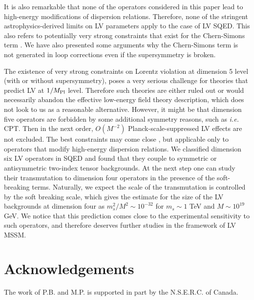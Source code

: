 \documentclass[12pt]{revtex4}
\begin{document}
It is also remarkable that none of the 
operators considered in this paper lead to high-energy modifications of dispersion relations. 
Therefore, none of the stringent astrophysics-derived limits on LV parameters 
\cite{Ted1,GK} apply to the case of LV SQED. This also refers to potentially very strong 
constraints that exist for the Chern-Simons term \cite{CFJ}. We have also presented 
some arguments why the Chern-Simons term is not generated in loop corrections 
 even if the supersymmetry is broken. 
 
The existence of very strong constraints on Lorentz violation 
at dimension 5 level (with or without supersymmetry), 
poses a very serious challenge for theories that predict LV at $1/M_{\rm Pl}$ level. 
Therefore such theories are either ruled out or would necessarily 
abandon the effective low-energy field theory description,
which does not look to us as a reasonable alternative. However, it might be that dimension 
five operators are forbidden by some additional symmetry reasons, such as {\em i.e.} CPT. 
Then in the next order, $O(M^{-2})$ Planck-scale-suppressed LV effects 
are not excluded. The best constraints may come close \cite{Gagnon:2004xh},
 but applicable only to 
operators that modify high-energy dispersion relations. We classified 
dimension six LV operators in SQED and found that they 
couple to symmetric or antisymmetric two-index tensor
backgrounds. At the next step one can study their transmutation to dimension four 
operators in the presence of the soft-breaking terms. Naturally, we expect the 
scale of the transmutation is controlled by the soft breaking scale, 
which gives the estimate for the size of the 
LV backgrounds at dimension four as $m_s^2/M^2 \sim 10^{-32}$
for $m_s\sim1$ TeV and $M\sim 10^{19}$ GeV. We notice that this prediction 
comes close to the experimental sensitivity to such operators,
and therefore deserves further studies in the framework of LV MSSM. 



\section*{Acknowledgements}
The work of P.B. and M.P. is supported in part by the N.S.E.R.C. of Canada. 



\newpage
\appendix
\end{document}
